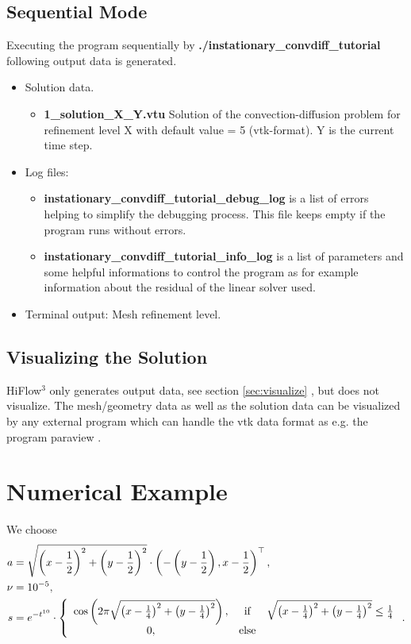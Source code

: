 \documentclass[a4paper, 11pt, twoside]{article}
\begin{document}
\subsection{Sequential Mode} 
Executing the program sequentially by \textbf{./instationary\_convdiff\_tutorial} following output data is generated. 
\begin{itemize}
\item Solution data. 
\begin{itemize}
\item \textbf{1\_solution\_X\_Y.vtu} Solution of the convection-diffusion problem for refinement level X with default value = 5 (vtk-format). Y is the current time step.
\end{itemize}
\item Log files:
\begin{itemize}
\item \textbf{instationary\_convdiff\_tutorial\_debug\_log} is a list of errors helping to simplify the debugging process. This file keeps empty if the program runs without errors.
\item \textbf{instationary\_convdiff\_tutorial\_info\_log} is a list of parameters and some helpful informations to control the program as for example information about the residual of the linear solver used.
\end{itemize}
\item Terminal output:  Mesh refinement level.
\end{itemize}

\subsection{Visualizing the Solution}
HiFlow$^3$ only generates output data, see section \ref{sec:visualize} , but does not visualize. The mesh/geometry data as well as the solution data can be visualized by any external program which can handle the vtk data format as e.g. the program paraview \cite{Paraview}.

\section{Numerical Example}\label{numeric}
We choose 
	\begin{align}
		a &= \sqrt{\left(x - \frac{1}{2}\right)^{2} + \left(y - \frac{1}{2}\right)^{2}} \cdot \left(-\left(y - \frac{1}{2}\right), x - \frac{1}{2}\right)^{\top}, \label{convel}\\
		\nu &= 10^{-5}, \notag \\
		s &= e^{-t^{10}} \cdot \left\{\begin{array}{ccl}\cos\left(2\pi\sqrt{\left(x - \frac{1}{4}\right)^{2} +
		 \left(y - \frac{1}{4}\right)^{2}}\right), & \text{if} & \sqrt{\left(x - \frac{1}{4}\right)^{2} +
		 \left(y - \frac{1}{4}\right)^{2}} \leq \frac{1}{4} \\ 0, & \text{else}\end{array}\right.. \notag
	\end{align}
\end{document}
